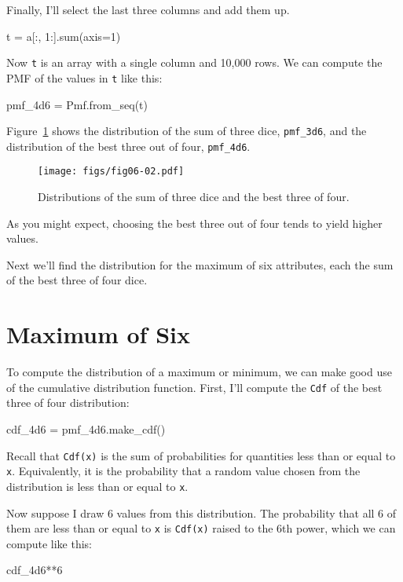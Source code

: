 \documentclass[12pt]{book}
\theoremstyle{exercise}
\newcommand{\py}[1]{{\tt #1}}%
\begin{document}
Finally, I'll select the last three columns and add them up.

\begin{code}
t = a[:, 1:].sum(axis=1)
\end{code}

Now \py{t} is an array with a single column and 10,000 rows.
We can compute the PMF of the values in \py{t} like this:

\begin{code}
pmf_4d6 = Pmf.from_seq(t)
\end{code}

Figure~\ref{fig06-02} shows the distribution of the sum of three dice, \py{pmf_3d6}, and the distribution of the best three out of four, \py{pmf_4d6}.

\begin{figure}
\centerline{\texttt{[image: figs/fig06-02.pdf]}}
\caption{Distributions of the sum of three dice and the best three of four.}
\label{fig06-02}
\end{figure}

As you might expect, choosing the best three out of four tends to yield higher values.

Next we'll find the distribution for the maximum of six attributes, each the sum of the best three of four dice.


\section{Maximum of Six}

To compute the distribution of a maximum or minimum, we can make good use of the cumulative distribution function.
First, I'll compute the \py{Cdf} of the best three of four distribution:

\begin{code}
cdf_4d6 = pmf_4d6.make_cdf()
\end{code}

Recall that \py{Cdf(x)} is the sum of probabilities for quantities less than or equal to \py{x}.
Equivalently, it is the probability that a random value chosen from the distribution is less than or equal to \py{x}.

Now suppose I draw 6 values from this distribution.
The probability that all 6 of them are less than or equal to \py{x} is \py{Cdf(x)} raised to the 6th power, which we can compute like this:

\begin{code}
cdf_4d6**6
\end{code}
\end{document}

